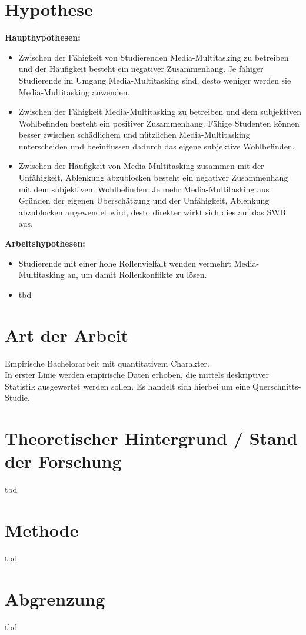 \section*{Hypothese}\label{section.hypothesen}
\textbf{Haupthypothesen:}
\begin{itemize}
    \item Zwischen der Fähigkeit von Studierenden Media-Multitasking zu betreiben und der Häufigkeit besteht ein negativer Zusammenhang. Je fähiger Studierende im Umgang Media-Multitasking sind, desto weniger werden sie Media-Multitasking anwenden.
    \item Zwischen der Fähigkeit Media-Multitasking zu betreiben und dem subjektiven Wohlbefinden besteht ein positiver Zusammenhang. Fähige Studenten können besser zwischen schädlichem und nützlichen Media-Multitasking unterscheiden und beeinflussen dadurch das eigene subjektive Wohlbefinden.
    \item Zwischen der Häufigkeit von Media-Multitasking zusammen mit der Unfähigkeit, Ablenkung abzublocken besteht ein negativer Zusammenhang mit dem subjektivem Wohlbefinden. Je mehr Media-Multitasking aus Gründen der eigenen Überschätzung und der Unfähigkeit, Ablenkung abzublocken angewendet wird, desto direkter wirkt sich dies auf das SWB aus.
\end{itemize}
\textbf{Arbeitshypothesen:}
\begin{itemize}
    \item Studierende mit einer hohe Rollenvielfalt wenden vermehrt Media-Multitasking an, um damit Rollenkonflikte zu lösen.
    \item tbd
\end{itemize}
\section*{Art der Arbeit}\label{section.artArbeit}
Empirische Bachelorarbeit mit quantitativem Charakter. \\
In erster Linie werden empirische Daten erhoben, die mittels deskriptiver Statistik ausgewertet werden sollen. Es handelt sich hierbei um eine Querschnitts-Studie. 
\section*{Theoretischer Hintergrund / Stand der Forschung}\label{section.forschung}
tbd
\section*{Methode}\label{section.methode}
tbd
\section*{Abgrenzung}\label{section.abgrenzung}
tbd
